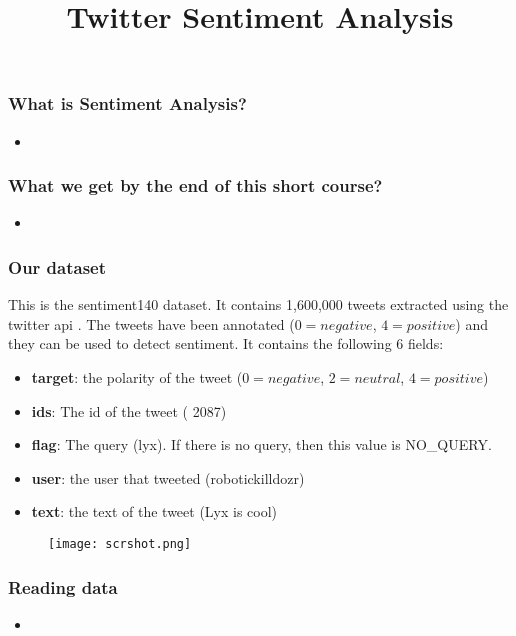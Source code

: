 \documentclass[aspectratio=13]{beamer}
\title{\huge{Twitter Sentiment Analysis}}
\author{\text{Dr. Mehrdad Maleki}}
\date{}
\begin{document}
\frame{\titlepage}

\begin{frame}
\frametitle{What is Sentiment Analysis?}
\begin{itemize}
\setlength\itemsep{1em}
\item 
\end{itemize}
\end{frame}


\begin{frame}
\frametitle{What we get by the end of this short course?}
\begin{itemize}
\setlength\itemsep{1em}
\item 
\end{itemize}
\end{frame}


\begin{frame}
\frametitle{Our dataset}
This is the sentiment140 dataset. It contains 1,600,000 tweets extracted using the twitter api . The tweets have been annotated ($0 = negative$, $4 = positive$) and they can be used to detect sentiment. It contains the following 6 fields:
\begin{itemize}
\setlength\itemsep{1em}
\item \textbf{target}: the polarity of the tweet ($0 = negative$, $2 = neutral$, $4 = positive$)
\item \textbf{ids}: The id of the tweet ( 2087)
\item \textbf{flag}: The query (lyx). If there is no query, then this value is NO\_QUERY.
\item \textbf{user}: the user that tweeted (robotickilldozr)
\item \textbf{text}: the text of the tweet (Lyx is cool)
\end{itemize}
\end{frame}



\begin{frame}
\begin{figure}
\texttt{[image: scrshot.png]}
\end{figure}
\end{frame}


\begin{frame}
\frametitle{Reading data}
\begin{itemize}
\setlength\itemsep{1em}
\item 
\end{itemize}
\end{frame}
\end{document}
